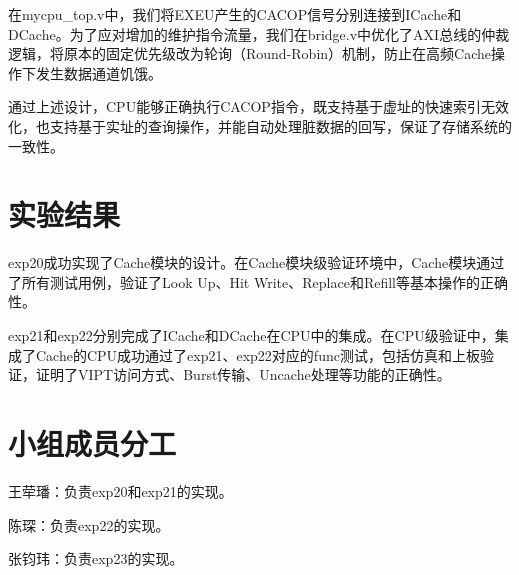 \documentclass[11pt]{article}
\begin{document}
在mycpu_top.v中，我们将EXEU产生的CACOP信号分别连接到ICache和DCache。为了应对增加的维护指令流量，我们在bridge.v中优化了AXI总线的仲裁逻辑，将原本的固定优先级改为轮询（Round-Robin）机制，防止在高频Cache操作下发生数据通道饥饿。

通过上述设计，CPU能够正确执行CACOP指令，既支持基于虚址的快速索引无效化，也支持基于实址的查询操作，并能自动处理脏数据的回写，保证了存储系统的一致性。

\section{实验结果}

exp20成功实现了Cache模块的设计。在Cache模块级验证环境中，Cache模块通过了所有测试用例，验证了Look Up、Hit Write、Replace和Refill等基本操作的正确性。

exp21和exp22分别完成了ICache和DCache在CPU中的集成。在CPU级验证中，集成了Cache的CPU成功通过了exp21、exp22对应的func测试，包括仿真和上板验证，证明了VIPT访问方式、Burst传输、Uncache处理等功能的正确性。

\section{小组成员分工}

王荦璠：负责exp20和exp21的实现。

陈琛：负责exp22的实现。

张钧玮：负责exp23的实现。
\end{document}
